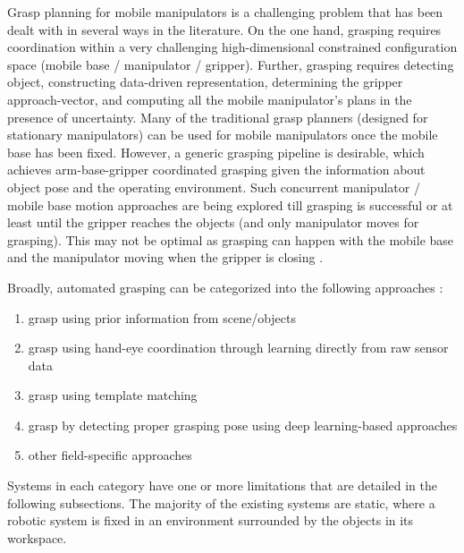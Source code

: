 Grasp planning for mobile manipulators is a challenging problem that has been
dealt with in several ways in the literature. On the one hand, grasping requires coordination
within a very challenging high-dimensional constrained configuration space (mobile base /
manipulator / gripper). Further, grasping requires detecting object, constructing data-driven
representation, determining the gripper approach-vector, and computing all the mobile manipulator's
plans in the presence of uncertainty. Many of the traditional grasp planners (designed for stationary
manipulators) can be used for mobile manipulators once the mobile base has been fixed.
However, a generic grasping pipeline is desirable, which achieves arm-base-gripper
coordinated grasping given the information about object pose and
the operating environment. Such concurrent manipulator / mobile base motion approaches are being
explored till grasping is successful or at least until the gripper reaches the
objects (and only manipulator moves for grasping). This may not be optimal as grasping can happen
with the mobile base and the manipulator moving when the gripper is closing \cite{thakar2023survey}.

Broadly, automated grasping can be categorized into the following approaches 
\cite{asadi2019construction}: 

\begin{enumerate}
	\item grasp using prior information from scene/objects
	\item grasp using hand-eye coordination through learning directly from raw sensor data
	\item grasp using template matching
	\item grasp by detecting proper grasping pose using deep learning-based approaches
	\item other field-specific approaches
\end{enumerate}

Systems in each category have one or more limitations that are detailed in the following
subsections. The majority of the existing systems are static, where a robotic system 
is fixed in an environment surrounded by the objects in its workspace.


